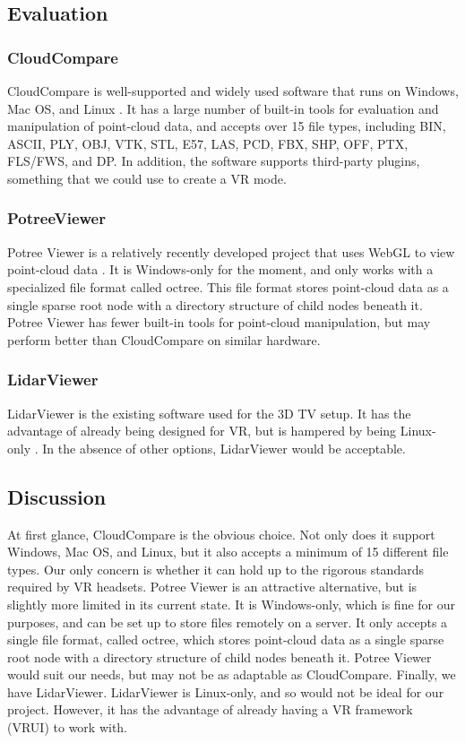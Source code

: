 \documentclass{article}
\begin{document}
\subsection{Evaluation}
\subsubsection{CloudCompare}
CloudCompare is well-supported and widely used software that runs on Windows, Mac OS, and Linux \cite{cloudcompare}.
It has a large number of built-in tools for evaluation and manipulation of point-cloud data, and accepts over 15 file types, including BIN, ASCII, PLY, OBJ, VTK, STL, E57, LAS, PCD, FBX, SHP, OFF, PTX, FLS/FWS, and DP. 
In addition, the software supports third-party plugins, something that we could use to create a VR mode. 

\subsubsection{PotreeViewer}
Potree Viewer is a relatively recently developed project that uses WebGL to view point-cloud data \cite{potree}.
It is Windows-only for the moment, and only works with a specialized file format called octree. 
This file format stores point-cloud data as a single sparse root node with a directory structure of child nodes beneath it. 
Potree Viewer has fewer built-in tools for point-cloud manipulation, but may perform better than CloudCompare on similar hardware. 

\subsubsection{LidarViewer}
LidarViewer is the existing software used for the 3D TV setup. It has the advantage of already being designed for VR, but is hampered by being Linux-only \cite{lidarviewer}.
In the absence of other options, LidarViewer would be acceptable.

\subsection{Discussion}
At first glance, CloudCompare is the obvious choice. 
Not only does it support Windows, Mac OS, and Linux, but it also accepts a minimum of 15 different file types. 
Our only concern is whether it can hold up to the rigorous standards required by VR headsets. 
Potree Viewer is an attractive alternative, but is slightly more limited in its current state. 
It is Windows-only, which is fine for our purposes, and can be set up to store files remotely on a server. 
It only accepts a single file format, called octree, which stores point-cloud data as a single sparse root node with a directory structure of child nodes beneath it. 
Potree Viewer would suit our needs, but may not be as adaptable as CloudCompare. 
Finally, we have LidarViewer. LidarViewer is Linux-only, and so would not be ideal for our project. 
However, it has the advantage of already having a VR framework (VRUI) to work with.
\end{document}

